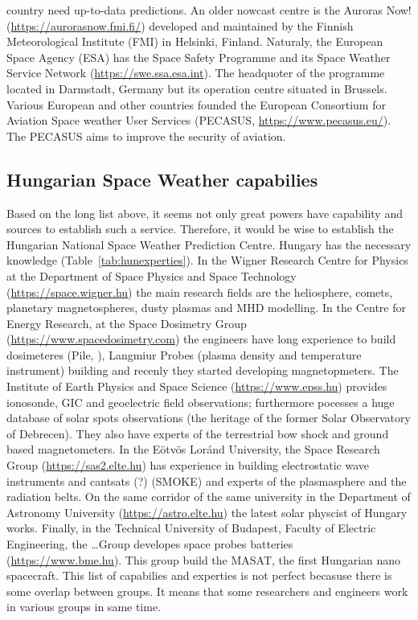 \documentclass[sn-aps]{sn-jnl}%
\begin{document}
country need up-to-data predictions. An older nowcast centre is the Auroras Now! (\url{https://aurorasnow.fmi.fi/}) developed and maintained by the Finnish Meteorological Institute (FMI) in Helsinki, Finland. Naturaly, the European Space Agency (ESA) has the Space Safety Programme and its Space Weather Service Network (\url{https://swe.ssa.esa.int}). The headquoter of the programme located in Darmstadt, Germany but its operation centre situated in Brussels. Various European and other countries founded the European Consortium for Aviation Space weather User Services (PECASUS, \url{https://www.pecasus.eu/}). The PECASUS aims to improve the security of aviation.  

\subsection{Hungarian Space Weather capabilies}
\label{sec:hunswcap}

Based on the long list above, it seems not only great powers have capability and sources to establish such a service. Therefore, it would be wise to establish the Hungarian National Space Weather Prediction Centre. Hungary has the necessary knowledge (Table~\ref{tab:hunexperties}). In the Wigner Research Centre for Physics at the Department of Space Physics and Space Technology (\url{https://space.wigner.hu}) the main research fields are the heliosphere, comets, planetary magnetospheres, dusty plasmas and MHD modelling. In the Centre for Energy Research, at the Space Dosimetry Group (\url{https://www.spacedosimetry.com}) the engineers have long experience to build dosimeteres (Pile, \cite{}), Langmiur Probes (plasma density and temperature instrument) building and recenly they started developing magnetopmeters. The Institute of Earth Physics and Space Science (\url{https://www.epss.hu}) provides ionosonde, GIC and geoelectric field observations; furthermore pocesses a huge database of solar spots observations (the heritage of the former Solar Observatory of Debrecen). They also have experts of the terrestrial bow shock and ground based magnetometers. In the E{\"o}tv{\"o}s Lor{\'a}nd University, the Space Research Group (\url{https://sas2.elte.hu}) has experience in building electrostatic wave instruments and cantsats (?) (SMOKE) \cite{} and experts of the plasmasphere and the radiation belts. On the same corridor of the same university in the Department of Astronomy University (\url{https://astro.elte.hu}) the latest solar physcist of Hungary works. Finally, in the Technical University of Budapest, Faculty of Electric Engineering, the \dots Group developes space probes batteries (\url{https://www.bme.hu}). This group build the MASAT, the first Hungarian nano spacecraft. This list of capabilies and experties is not perfect becasuse there is some overlap between groups. It means that some researchers and engineers work in various groups in same time. 
\end{document}
